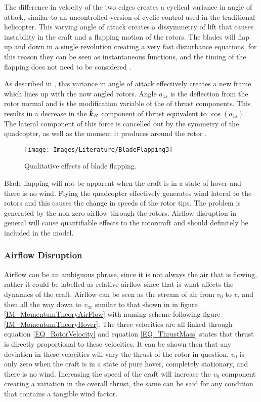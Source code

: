 The difference in velocity of the two edges creates a cyclical variance in angle of attack, similar to an uncontrolled version of cyclic control used in the traditional helicopter. This varying angle of attack creates a dissymmetry of lift that causes instability in the craft and a flapping motion of the rotors. The blades will flap up and down in a single revolution creating a very fast disturbance equations, for this reason they can be seen as instantaneous functions, and the timing of the flapping does not need to be considered \cite{Pounds2006}.

As described in \cite{Hoffmann, Pounds2006}, this variance in angle of attack effectively creates a new frame which lines up with the now angled rotors. Angle $a_{1s}$ is the deflection from the rotor normal and is the modification variable of the of thrust components. This results in a decrease in the $\hat{\textbf{\textit{k}}}_B$ component of thrust equivalent to $\cos (a_{1s})$. The lateral component of this force is cancelled out by the symmetry of the quadcopter, as well as the moment it produces around the rotor \cite{Hoffmann}.

\begin{figure}[H]
	\centering
	\texttt{[image: Images/Literature/BladeFlapping3]}     
	\caption{Qualitative effects of blade flapping.}
	\label{IM_BladeFlapping}
\end{figure}

Blade flapping will not be apparent when the craft is in a state of hover and there is no wind. Flying the quadcopter effectively generates wind lateral to the rotors and this causes the change in speeds of the rotor tips. The problem is generated by the non zero airflow through the rotors. Airflow disruption in general will cause quantifiable effects to the rotorcraft and should definitely be included in the model.

\subsubsection{Airflow Disruption}
Airflow can be an ambiguous phrase, since it is not always the air that is flowing, rather it could be labelled as relative airflow since that is what affects the dynamics of the craft. Airflow can be seen as the stream of air from $v_0$ to $v_i$ and then all the way down to $v_\infty$ similar to that shown in in figure \ref{IM_MomentumTheoryAirFlow} with naming scheme following figure \ref{IM_MomentumTheoryHover}. The three velocities are all linked through equation \ref{EQ_RotorVelocity} and equation \ref{EQ_ThrustMass} states that thrust is directly proportional to these velocities. It can be shown then that any deviation in these velocities will vary the thrust of the rotor in question. $v_0$ is only zero when the craft is in a state of pure hover, completely stationary, and there is no wind. Increasing the speed of the craft will increase the $v_0$ component creating a variation in the overall thrust, the same can be said for any condition that contains a tangible wind factor. 

